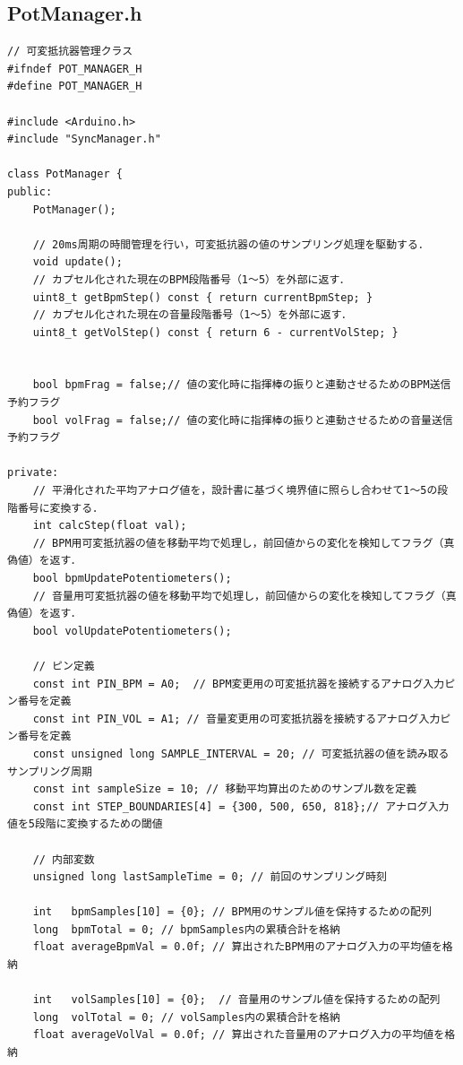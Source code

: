 \subsection{PotManager.h}
\begin{lstlisting}[caption={PotManager.h}, label={lst:siki_pot_h}]
// 可変抵抗器管理クラス
#ifndef POT_MANAGER_H
#define POT_MANAGER_H

#include <Arduino.h>
#include "SyncManager.h"

class PotManager {
public:
    PotManager();
    
    // 20ms周期の時間管理を行い，可変抵抗器の値のサンプリング処理を駆動する．
    void update();
    // カプセル化された現在のBPM段階番号（1〜5）を外部に返す．
    uint8_t getBpmStep() const { return currentBpmStep; }
    // カプセル化された現在の音量段階番号（1〜5）を外部に返す．
    uint8_t getVolStep() const { return 6 - currentVolStep; }

    
    bool bpmFrag = false;// 値の変化時に指揮棒の振りと連動させるためのBPM送信予約フラグ
    bool volFrag = false;// 値の変化時に指揮棒の振りと連動させるための音量送信予約フラグ

private:
    // 平滑化された平均アナログ値を，設計書に基づく境界値に照らし合わせて1〜5の段階番号に変換する．
    int calcStep(float val);
    // BPM用可変抵抗器の値を移動平均で処理し，前回値からの変化を検知してフラグ（真偽値）を返す．
    bool bpmUpdatePotentiometers();
    // 音量用可変抵抗器の値を移動平均で処理し，前回値からの変化を検知してフラグ（真偽値）を返す．
    bool volUpdatePotentiometers();

    // ピン定義
    const int PIN_BPM = A0;  // BPM変更用の可変抵抗器を接続するアナログ入力ピン番号を定義
    const int PIN_VOL = A1; // 音量変更用の可変抵抗器を接続するアナログ入力ピン番号を定義
    const unsigned long SAMPLE_INTERVAL = 20; // 可変抵抗器の値を読み取るサンプリング周期
    const int sampleSize = 10; // 移動平均算出のためのサンプル数を定義
    const int STEP_BOUNDARIES[4] = {300, 500, 650, 818};// アナログ入力値を5段階に変換するための閾値

    // 内部変数
    unsigned long lastSampleTime = 0; // 前回のサンプリング時刻
    
    int   bpmSamples[10] = {0}; // BPM用のサンプル値を保持するための配列
    long  bpmTotal = 0; // bpmSamples内の累積合計を格納
    float averageBpmVal = 0.0f; // 算出されたBPM用のアナログ入力の平均値を格納
   
    int   volSamples[10] = {0};  // 音量用のサンプル値を保持するための配列
    long  volTotal = 0; // volSamples内の累積合計を格納
    float averageVolVal = 0.0f; // 算出された音量用のアナログ入力の平均値を格納
    

\end{lstlisting}
